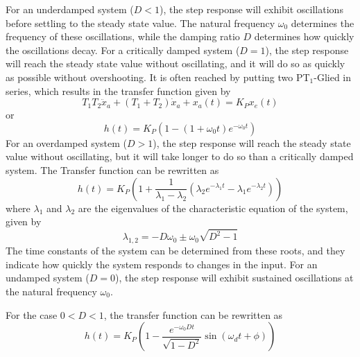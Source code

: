 \documentclass[12pt, oneside, a4paper]{scrreprt}
\begin{document}
                    For an underdamped system ($D < 1$), the step response will exhibit oscillations before settling to the steady state value. The natural frequency $\omega_0$ determines the frequency of these oscillations, while the damping ratio $D$ determines how quickly the oscillations decay. 
                    For a critically damped system ($D = 1$), the step response will reach the steady state value without oscillating, and it will do so as quickly as possible without overshooting. It is often reached by putting two PT$_1$-Glied in series, which results in the transfer function given by 
                    \begin{equation}
                        T_1T_2 \ddot{x}_a + (T_1 + T_2) \dot{x}_a + x_a(t) = K_P x_e(t)
                    \end{equation}
                    or 
                    \begin{equation}
                        h(t) = K_P \left(1 - (1 + \omega_0 t)e^{-\omega_0 t}\right)
                    \end{equation}
                    For an overdamped system ($D > 1$), the step response will reach the steady state value without oscillating, but it will take longer to do so than a critically damped system. The Transfer function can be rewritten as 
                    \begin{equation}
                        h(t) = K_P \left(1 + \frac{1}{\lambda_1 - \lambda_2}(\lambda_2e^{-\lambda_1t} - \lambda_1e^{-\lambda_2t})\right)
                    \end{equation} 
                    where $\lambda_1$ and $\lambda_2$ are the eigenvalues of the characteristic equation of the system, given by 
                    \begin{equation}
                        \lambda_{1,2} = -D\omega_0 \pm \omega_0\sqrt{D^2 - 1}
                    \end{equation}    
                    The time constants of the system can be determined from these roots, and they indicate how quickly the system responds to changes in the input.
                    For an undamped system ($D = 0$), the step response will exhibit sustained oscillations at the natural frequency $\omega_0$.

                    For the case $0 < D < 1$, the transfer function can be rewritten as 
                    \begin{equation}
                        h(t) = K_P \left(1 - \frac{e^{-\omega_0 D t}}{\sqrt{1 - D^2}} \sin(\omega_d t + \phi)\right)
                    \end{equation}
\end{document}
